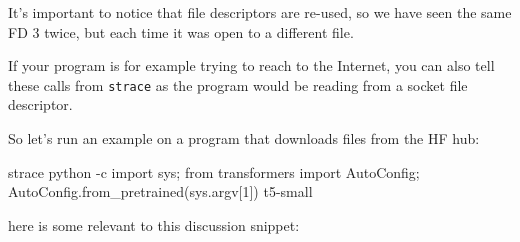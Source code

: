 \documentclass[
]{report}
\newenvironment{Shaded}{\begin{snugshade}}{\end{snugshade}}
\newcommand{\AttributeTok}[1]{\textcolor[rgb]{0.40,0.45,0.13}{#1}}
\newcommand{\ExtensionTok}[1]{\textcolor[rgb]{0.00,0.23,0.31}{#1}}
\newcommand{\NormalTok}[1]{\textcolor[rgb]{0.00,0.23,0.31}{#1}}
\newcommand{\StringTok}[1]{\textcolor[rgb]{0.13,0.47,0.30}{#1}}
\begin{document}
It's important to notice that file descriptors are re-used, so we have
seen the same FD 3 twice, but each time it was open to a different file.

If your program is for example trying to reach to the Internet, you can
also tell these calls from \texttt{strace} as the program would be
reading from a socket file descriptor.

So let's run an example on a program that downloads files from the HF
hub:

\begin{Shaded}
\begin{Highlighting}[]
\ExtensionTok{strace}\NormalTok{ python }\AttributeTok{{-}c} \StringTok{\textquotesingle{}import sys; from transformers import AutoConfig; AutoConfig.from\_pretrained(sys.argv[1])\textquotesingle{}}\NormalTok{ t5{-}small}
\end{Highlighting}
\end{Shaded}

here is some relevant to this discussion snippet:
\end{document}
